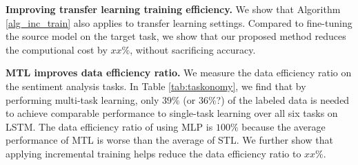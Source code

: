 \textbf{Improving transfer learning training efficiency.}
We show that Algorithm \ref{alg_inc_train} also applies to transfer learning settings.
Compared to fine-tuning the source model on the target task, we show that our proposed method reduces the computional cost by \alert{$xx\%$}, without sacrificing accuracy.

\textbf{MTL improves data efficiency ratio.}
We measure the data efficiency ratio on the sentiment analysis tasks.
In Table \ref{tab:taskonomy}, we find that by performing multi-task learning, only $39\%$ ({\cor or $36\%$?}) of the labeled data is needed to achieve comparable performance to single-task learning over all six tasks on LSTM.
The data efficiency ratio of using MLP is $100\%$ because the average performance of MTL is worse than the average of STL.
We further show that applying incremental training helps reduce the data efficiency ratio to \alert{$xx\%$}.


